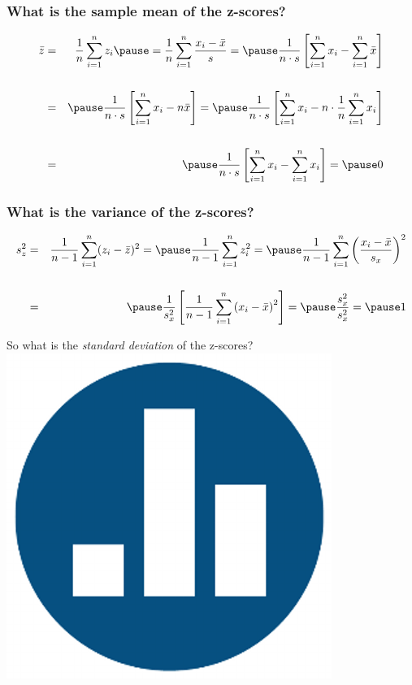 
\begin{frame}
\frametitle{What is the sample mean of the z-scores?}
\begin{eqnarray*}
 \bar{z} &=& \frac{1}{n}\sum_{i=1}^n z_i \pause= \frac{1}{n} \sum_{i=1}^n \frac{x_i - \bar{x}}{s}= \pause\frac{1}{n\cdot s} \left[\sum_{i=1}^n x_i  - \sum_{i=1}^n \bar{x}  \right]\\ \\
 &=& \pause\frac{1}{n\cdot s} \left[\sum_{i=1}^n x_i  - n\bar{x}  \right] = \pause\frac{1}{n\cdot s} \left[\sum_{i=1}^n x_i - n\cdot \frac{1}{n} \sum_{i=1}^n x_i  \right] \\ \\
 	&=&\pause \frac{1}{n\cdot s} \left[\sum_{i=1}^n x_i -  \sum_{i=1}^n x_i  \right]  = \pause 0
\end{eqnarray*}
\end{frame}



\begin{frame}
\frametitle{What is the variance of the z-scores?}
\begin{eqnarray*}
	s^2_z &=& \frac{1}{n-1}\sum_{i=1}^n (z_i - \bar{z})^2 =\pause \frac{1}{n-1}\sum_{i=1}^n z_i^2 = \pause \frac{1}{n-1} \sum_{i=1}^n \left(\frac{x_i - \bar{x}}{s_x}\right)^2\\\\
	&=& \pause \frac{1}{s_x^2} \left[ \frac{1}{n-1} \sum_{i=1}^n \left(x_i - \bar{x}\right)^2 \right] = \pause \frac{s_x^2}{s_x^2} = \pause 1
	\end{eqnarray*}
	
	\pause
	\vspace{5em}
	\alert{So what is the \emph{standard deviation} of the z-scores? \hfill \includegraphics[scale = 0.03]{./images/clicker} }
\end{frame}


